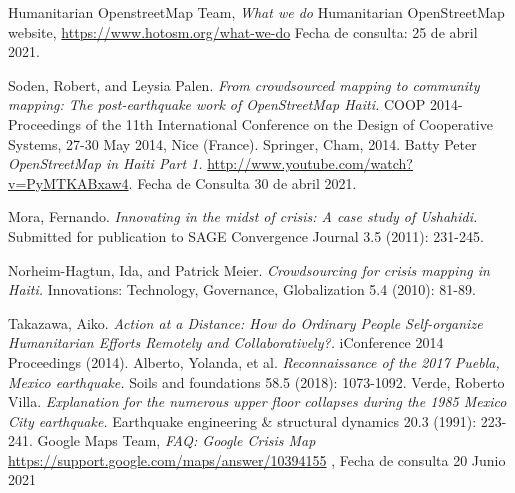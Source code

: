 \documentclass[12pt,spanish,oneside,breaklinks]{book}
\begin{document}
\begin{thebibliography}{1}
   Humanitarian OpenstreetMap Team, {\em What we do} Humanitarian OpenStreetMap website, \url{https://www.hotosm.org/what-we-do} Fecha de consulta: 25 de abril 2021.

   Soden, Robert, and Leysia Palen. {\em From crowdsourced mapping to community mapping: The post-earthquake work of OpenStreetMap Haiti.} COOP 2014-Proceedings of the 11th International Conference on the Design of Cooperative Systems, 27-30 May 2014, Nice (France). Springer, Cham, 2014.
   Batty Peter  {\em OpenStreetMap in Haiti Part 1.} \url{http://www.youtube.com/watch?v=PyMTKABxaw4}. Fecha de Consulta 30 de abril 2021.

   Mora, Fernando. {\em Innovating in the midst of crisis: A case study of Ushahidi.} Submitted for publication to SAGE Convergence Journal 3.5 (2011): 231-245.

   Norheim-Hagtun, Ida, and Patrick Meier. {\em Crowdsourcing for crisis mapping in Haiti.} Innovations: Technology, Governance, Globalization 5.4 (2010): 81-89.

   Takazawa, Aiko. {\em Action at a Distance: How do Ordinary People Self-organize Humanitarian Efforts Remotely and Collaboratively?.} iConference 2014 Proceedings (2014).
     Alberto, Yolanda, et al. {\em Reconnaissance of the 2017 Puebla, Mexico earthquake.} Soils and foundations 58.5 (2018): 1073-1092.
   Verde, Roberto Villa. {\em Explanation for the numerous upper floor collapses during the 1985 Mexico City earthquake.} Earthquake engineering \& structural dynamics 20.3 (1991): 223-241.
 Google Maps Team, {\em FAQ: Google Crisis Map}  \url{https://support.google.com/maps/answer/10394155} , Fecha de consulta 20 Junio 2021
\end{thebibliography}
\newpage
\end{document}
